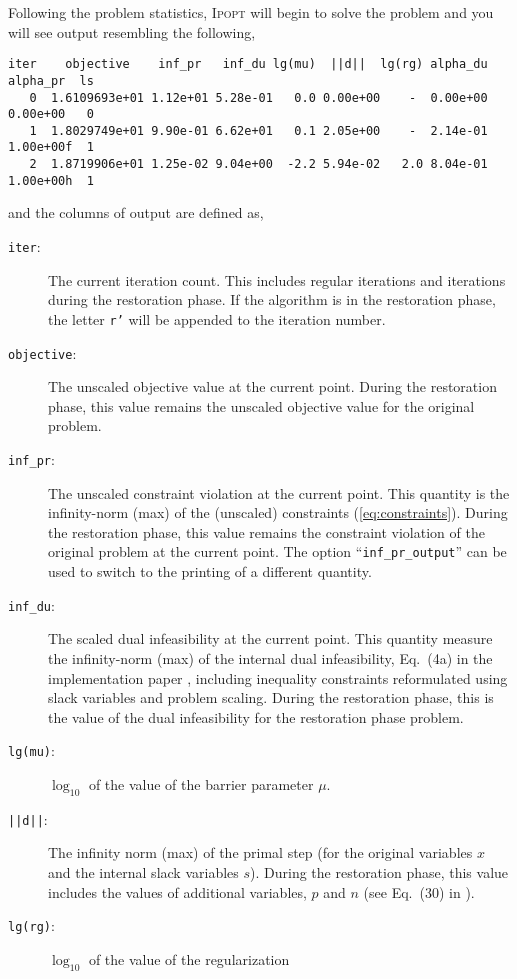 \documentclass[10pt]{article}
\newcommand{\Ipopt}{\textsc{Ipopt}\xspace}
\begin{document}
Following the problem statistics, \Ipopt will begin to solve the
problem and you will see output resembling the following,
\begin{verbatim}
iter    objective    inf_pr   inf_du lg(mu)  ||d||  lg(rg) alpha_du alpha_pr  ls
   0  1.6109693e+01 1.12e+01 5.28e-01   0.0 0.00e+00    -  0.00e+00 0.00e+00   0
   1  1.8029749e+01 9.90e-01 6.62e+01   0.1 2.05e+00    -  2.14e-01 1.00e+00f  1
   2  1.8719906e+01 1.25e-02 9.04e+00  -2.2 5.94e-02   2.0 8.04e-01 1.00e+00h  1
\end{verbatim}
and the columns of output are defined as,
\begin{description}
\item[{\tt iter}:] The current iteration count. This includes regular
  iterations and iterations during the restoration phase. If the
  algorithm is in the restoration phase, the letter {\tt r'} will be
  appended to the iteration number.
\item[{\tt objective}:] The unscaled objective value at the current
  point. During the restoration phase, this value remains the unscaled
  objective value for the original problem.
\item[{\tt inf\_pr}:] The unscaled constraint violation at the current
  point.  This quantity is the infinity-norm (max) of the (unscaled)
  constraints (\ref{eq:constraints}).  During the restoration phase,
  this value remains the constraint violation of the original problem
  at the current point.  The option ``\texttt{inf\_pr\_output}'' can
  be used to switch to the printing of a different quantity.
\item[{\tt inf\_du}:] The scaled dual infeasibility at the current
  point.  This quantity measure the infinity-norm (max) of the
  internal dual infeasibility, Eq.~(4a) in the implementation paper
  \cite{WaecBieg06:mp}, including inequality constraints reformulated
  using slack variables and problem scaling. During the restoration
  phase, this is the value of the dual infeasibility for the
  restoration phase problem.
\item[{\tt lg(mu)}:] $\log_{10}$ of the value of the barrier parameter
  $\mu$.
\item[{\tt ||d||}:] The infinity norm (max) of the primal step (for
  the original variables $x$ and the internal slack variables $s$).
  During the restoration phase, this value includes the values of
  additional variables, $p$ and $n$ (see Eq.~(30) in
  \cite{WaecBieg06:mp}).
\item[{\tt lg(rg)}:] $\log_{10}$ of the value of the regularization

\end{description}
\end{document}
